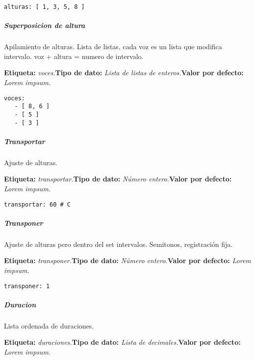 \documentclass[]{article}
\let\oldsubparagraph\subparagraph
\renewcommand{\subparagraph}[1]{\oldsubparagraph{#1}\mbox{}}
\begin{document}
\begin{verbatim}
alturas: [ 1, 3, 5, 8 ] 
\end{verbatim}

\hypertarget{superposicion-de-altura}{%
\subparagraph{Superposicion de altura}\label{superposicion-de-altura}}

Apilamiento de alturas. Lista de listas, cada voz es un lista que
modifica intervalo. voz + altura = numero de intervalo.

\textbf{Etiqueta:} \emph{voces.}\newline \textbf{Tipo de dato:}
\emph{Lista de listas de enteros.}\newline \textbf{Valor por defecto:}
\emph{Lorem impsum}.\newline

\begin{verbatim}
voces:
   - [ 8, 6 ] 
   - [ 5 ] 
   - [ 3 ]
\end{verbatim}

\hypertarget{transportar}{%
\subparagraph{Transportar}\label{transportar}}

Ajuste de alturas.

\textbf{Etiqueta:} \emph{transportar.}\newline \textbf{Tipo de dato:}
\emph{Número entero.}\newline \textbf{Valor por defecto:} \emph{Lorem
impsum}.\newline

\begin{verbatim}
transportar: 60 # C
\end{verbatim}

\hypertarget{transponer}{%
\subparagraph{Transponer}\label{transponer}}

Ajuste de alturas pero dentro del set intervalos. Semitonos,
registración fija.

\textbf{Etiqueta:} \emph{transponer.}\newline \textbf{Tipo de dato:}
\emph{Número entero.}\newline \textbf{Valor por defecto:} \emph{Lorem
impsum}.\newline

\begin{verbatim}
transponer: 1
\end{verbatim}

\hypertarget{duracion}{%
\subparagraph{Duracion}\label{duracion}}

Lista ordenada de duraciones.

\textbf{Etiqueta:} \emph{duraciones.}\newline \textbf{Tipo de dato:}
\emph{Lista de decimales.}\newline \textbf{Valor por defecto:}
\emph{Lorem impsum}.\newline
\end{document}
